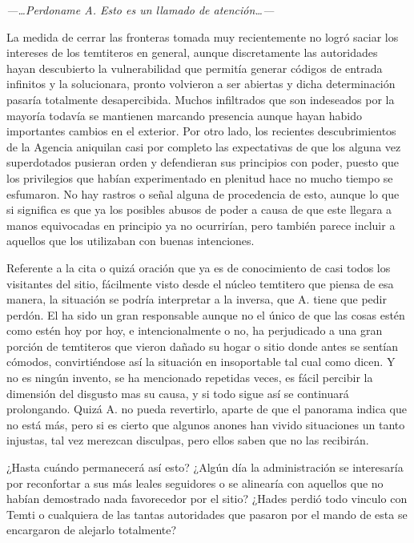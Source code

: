 \documentclass[
  spanish,
]{book}
\begin{document}
\emph{---\ldots Perdoname A.
Esto es un llamado de atención\ldots---}

La medida de cerrar las fronteras tomada muy recientemente no logró saciar los intereses de los temtiteros en general, aunque discretamente las autoridades hayan descubierto la vulnerabilidad que permitía generar códigos de entrada infinitos y la solucionara, pronto volvieron a ser abiertas y dicha determinación pasaría totalmente desapercibida. Muchos infiltrados que son indeseados por la mayoría todavía se mantienen marcando presencia aunque hayan habido importantes cambios en el exterior. Por otro lado, los recientes descubrimientos de la Agencia aniquilan casi por completo las expectativas de que los alguna vez superdotados pusieran orden y defendieran sus principios con poder, puesto que los privilegios que habían experimentado en plenitud hace no mucho tiempo se esfumaron. No hay rastros o señal alguna de procedencia de esto, aunque lo que si significa es que ya los posibles abusos de poder a causa de que este llegara a manos equivocadas en principio ya no ocurrirían, pero también parece incluir a aquellos que los utilizaban con buenas intenciones.

Referente a la cita o quizá oración que ya es de conocimiento de casi todos los visitantes del sitio, fácilmente visto desde el núcleo temtitero que piensa de esa manera, la situación se podría interpretar a la inversa, que A. tiene que pedir perdón. El ha sido un gran responsable aunque no el único de que las cosas estén como estén hoy por hoy, e intencionalmente o no, ha perjudicado a una gran porción de temtiteros que vieron dañado su hogar o sitio donde antes se sentían cómodos, convirtiéndose así la situación en insoportable tal cual como dicen. Y no es ningún invento, se ha mencionado repetidas veces, es fácil percibir la dimensión del disgusto mas su causa, y si todo sigue así se continuará prolongando. Quizá A. no pueda revertirlo, aparte de que el panorama indica que no está más, pero si es cierto que algunos anones han vivido situaciones un tanto injustas, tal vez merezcan disculpas, pero ellos saben que no las recibirán.

¿Hasta cuándo permanecerá así esto? ¿Algún día la administración se interesaría por reconfortar a sus más leales seguidores o se alinearía con aquellos que no habían demostrado nada favorecedor por el sitio? ¿Hades perdió todo vinculo con Temti o cualquiera de las tantas autoridades que pasaron por el mando de esta se encargaron de alejarlo totalmente?
\end{document}
